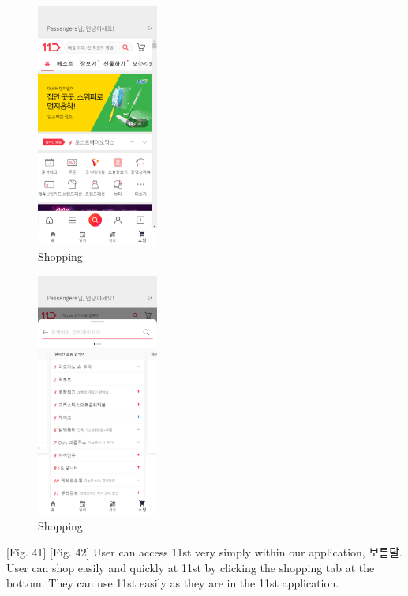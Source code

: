 \documentclass[conference]{IEEEtran}
\begin{document}
\begin{itemize}
    \begin{figure}[ht]
    \includegraphics[width=4cm, height=8cm, center]{shop1.png}
    \caption{Shopping}
    \label{fig41}
    \end{figure}
    
        \begin{figure}[ht]
        \includegraphics[width=4cm, height=8cm, center]{shop2.png}
        \caption{Shopping}
        \label{fig42}
        \end{figure}
    [Fig. 41] [Fig. 42] User can access 11st very simply within our application, 보름달. User can shop easily and quickly at 11st by clicking the shopping tab at the bottom.
    They can use 11st easily as they are in the 11st application.
\end{itemize}
\end{document}
